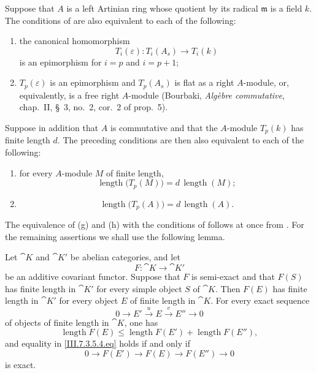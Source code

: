 \begin{proposition}[7.3.5]
\label{III.7.3.5}
Suppose that $A$ is a left Artinian ring whose quotient by its
radical $\mathfrak m$ is a field $k$.  The conditions of
 are also equivalent to each of the following:
\begin{enumerate}
  \item[(g)] the canonical homomorphism
    \[
      T_i(\varepsilon):T_i(A_s)\longrightarrow T_i(k)
    \]
    is an epimorphism for $i=p$ and $i=p+1$;
  \item[(h)] $T_p(\varepsilon)$ is an epimorphism and
    $T_p(A_s)$ is flat as a right $A$-module, or, equivalently,
    is a free right $A$-module (Bourbaki,
    \emph{Alg\`ebre commutative}, chap.~II, \S~3, no.~2,
    cor.~2 of prop.~5).
\end{enumerate}
Suppose in addition that $A$ is commutative and that the
$A$-module $T_p(k)$ has finite length $d$.  The preceding
conditions are then also equivalent to each of the following:
\begin{enumerate}
  \item[(i)] for every $A$-module $M$ of finite length,
    \[
      \operatorname{length}\bigl(T_p(M)\bigr)
      =
      d\,\operatorname{length}(M);
      \tag{7.3.5.1}\label{III.7.3.5.1.eq}
    \]
  \item[(j)]
    \[
      \operatorname{length}\bigl(T_p(A)\bigr)
      =
      d\,\operatorname{length}(A).
      \tag{7.3.5.2}\label{III.7.3.5.2.eq}
    \]
\end{enumerate}
\end{proposition}

The equivalence of (g) and (h) with the conditions of
 follows at once from .  For
the remaining assertions we shall use the following lemma.

\begin{lemma}[7.3.5.3]
\label{III.7.3.5.3}
Let $\cat{K}$ and $\cat{K}'$ be abelian categories, and let
\[
  F:\cat{K}\longrightarrow\cat{K}'
\]
be an additive covariant functor.  Suppose that $F$ is
semi-exact and that $F(S)$ has finite length in $\cat{K}'$ for
every simple object $S$ of $\cat{K}$.  Then $F(E)$ has finite
length in $\cat{K}'$ for every object $E$ of finite length in
$\cat{K}$.  For every exact sequence
\[
  0\longrightarrow E'
  \xrightarrow{u}E
  \xrightarrow{v}E''
  \longrightarrow0
\]
of objects of finite length in $\cat{K}$, one has
\[
  \operatorname{length}F(E)
  \leq
  \operatorname{length}F(E')
  +
  \operatorname{length}F(E''),
  \tag{7.3.5.4}\label{III.7.3.5.4.eq}
\]
and equality in \eqref{III.7.3.5.4.eq} holds if and only if
\[
  0\longrightarrow F(E')
  \longrightarrow F(E)
  \longrightarrow F(E'')
  \longrightarrow0
\]
is exact.
\end{lemma}

